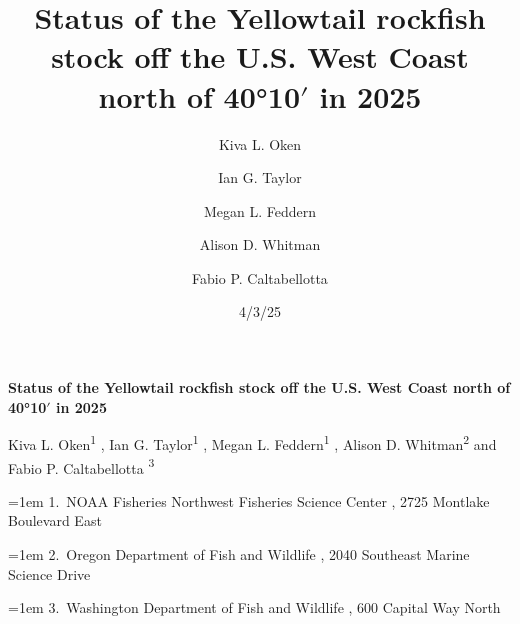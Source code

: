 \documentclass[
]{scrartcl}
\title{Status of the Yellowtail rockfish stock off the U.S. West Coast
north of 40°10\(\prime\) in 2025}
\author{Kiva L. Oken \and Ian G. Taylor \and Megan L.
Feddern \and Alison D. Whitman \and Fabio P. Caltabellotta}
\date{4/3/25}
\begin{document}
  \begin{titlepage}

  \begin{minipage}[b][\textheight][s]{\textwidth}


  \raggedright




  {\huge\bfseries\nohyphens{Status of the Yellowtail rockfish stock off
  the U.S. West Coast north of 40°10\(\prime\) in
  2025}}\\[1\baselineskip]



  \vspace{1\baselineskip}


  \vspace{1\baselineskip}

   {\large{Kiva L. Oken}}{\textsuperscript{1}}%
  ,
   {\large{Ian G. Taylor}}{\textsuperscript{1}}%
  ,
   {\large{Megan L. Feddern}}{\textsuperscript{1}}%
  ,
   {\large{Alison D. Whitman}}{\textsuperscript{2}}%
  { and \large{Fabio P. Caltabellotta}}%
  {\textsuperscript{3}}%



  \vspace{2\baselineskip}

  \hangindent=1em
  {1}.~{NOAA Fisheries Northwest Fisheries Science Center}%
  , %
  {2725 Montlake Boulevard East}%
  \par\hangindent=1em%
  {2}.~{Oregon Department of Fish and Wildlife}%
  , %
  {2040 Southeast Marine Science Drive}%
  \par\hangindent=1em%
  {3}.~{Washington Department of Fish and Wildlife}%
  , %
  {600 Capital Way North}%



\end{minipage}
\end{titlepage}
\end{document}
